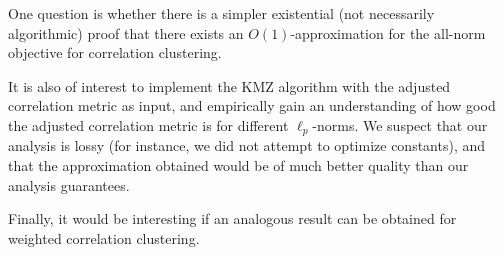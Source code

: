 \documentclass[11pt]{article}
\begin{document}
One question is whether there is a simpler existential (not necessarily algorithmic) proof that there exists an $O(1)$-approximation for the all-norm objective for correlation clustering.

It is also of interest to implement the KMZ algorithm with the adjusted correlation metric as input, and empirically gain an understanding of how good the adjusted correlation metric is for different $\ell_p$-norms. We suspect that our analysis is lossy (for instance, we did not attempt to optimize constants), and that the approximation obtained would be of much better quality than our analysis guarantees.

Finally, it would be interesting if an analogous result can be obtained for weighted correlation clustering.  

\newpage 

\printbibliography

\newpage 

\appendix


\end{document}
